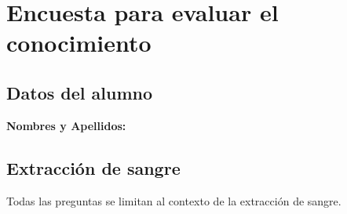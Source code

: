 \section{Encuesta para evaluar el conocimiento}
\renewcommand{\labelenumii}{\arabic{enumii})}

\subsection{Datos del alumno}
\tabitem{} \textbf{Nombres y Apellidos:}

\subsection{Extracción de sangre}

Todas las preguntas se limitan al contexto de la extracción de sangre.


